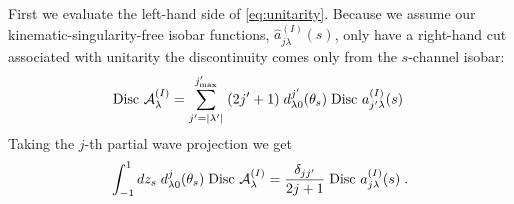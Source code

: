 First we evaluate the left-hand side of \cref{eq:unitarity}. Because we assume our kinematic-singularity-free isobar functions, \(\hat{a}^{(I)}_{j \lambda}(s)\), only have a right-hand cut associated with unitarity the discontinuity comes only from the \(s\)-channel isobar:
  \begin{equation}
    \label{eq:discontinuity}
    \text{Disc } \mathcal{A}^{(I)}_\lambda = \sum_{j^\prime=|{\lambda^\prime}|}^{j^\prime_\text{max}} \; (2 j^\prime +1)
    \; d^{j^\prime}_{\lambda 0}(\theta_s) \; \text{Disc } a^{(I)}_{{j^\prime} \lambda}(s) \;
  \end{equation}
Taking the \(j\)-th partial wave projection we get
  \begin{equation}
    \label{eq:pw-disc}
   \int_{-1}^1 dz_s  \; d^j_{\lambda 0}(\theta_s) \; \text{Disc } \mathcal{A}^{(I)}_\lambda =
    \frac{\delta_{j{j^\prime}}}{2j+1} \; \text{Disc } a^{(I)}_{j\lambda}(s) \; .
  \end{equation}

